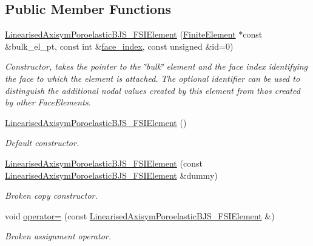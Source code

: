\subsection*{Public Member Functions}
\begin{DoxyCompactItemize}
\item 
\hyperlink{classoomph_1_1LinearisedAxisymPoroelasticBJS__FSIElement_af786a8812e9a940b2de1684156961114}{Linearised\+Axisym\+Poroelastic\+B\+J\+S\+\_\+\+F\+S\+I\+Element} (\hyperlink{classoomph_1_1FiniteElement}{Finite\+Element} $\ast$const \&bulk\+\_\+el\+\_\+pt, const int \&\hyperlink{classoomph_1_1FaceElement_a478d577ac6db67ecc80f1f02ae3ab170}{face\+\_\+index}, const unsigned \&id=0)
\begin{DoxyCompactList}\small\item\em Constructor, takes the pointer to the \char`\"{}bulk\char`\"{} element and the face index identifying the face to which the element is attached. The optional identifier can be used to distinguish the additional nodal values created by this element from thos created by other Face\+Elements. \end{DoxyCompactList}\item 
\hyperlink{classoomph_1_1LinearisedAxisymPoroelasticBJS__FSIElement_a17f409456685d395cabb151b547bd821}{Linearised\+Axisym\+Poroelastic\+B\+J\+S\+\_\+\+F\+S\+I\+Element} ()
\begin{DoxyCompactList}\small\item\em Default constructor. \end{DoxyCompactList}\item 
\hyperlink{classoomph_1_1LinearisedAxisymPoroelasticBJS__FSIElement_a4b975e17c3a6085387b519e0c1820426}{Linearised\+Axisym\+Poroelastic\+B\+J\+S\+\_\+\+F\+S\+I\+Element} (const \hyperlink{classoomph_1_1LinearisedAxisymPoroelasticBJS__FSIElement}{Linearised\+Axisym\+Poroelastic\+B\+J\+S\+\_\+\+F\+S\+I\+Element} \&dummy)
\begin{DoxyCompactList}\small\item\em Broken copy constructor. \end{DoxyCompactList}\item 
void \hyperlink{classoomph_1_1LinearisedAxisymPoroelasticBJS__FSIElement_a75df9eb4df42e96214d48a721d3eea90}{operator=} (const \hyperlink{classoomph_1_1LinearisedAxisymPoroelasticBJS__FSIElement}{Linearised\+Axisym\+Poroelastic\+B\+J\+S\+\_\+\+F\+S\+I\+Element} \&)
\begin{DoxyCompactList}\small\item\em Broken assignment operator. \end{DoxyCompactList}\item 

\end{DoxyCompactItemize}
